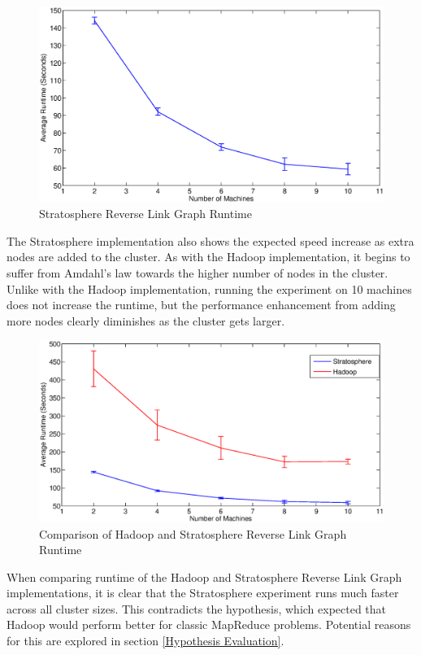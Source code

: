 \begin{figure}[H]
	\centering
	\includegraphics[scale=0.6]{resources/StratRLG.eps}
	\caption{Stratosphere Reverse Link Graph Runtime}
	\label{stratRLGRuntime}
\end{figure}

The Stratosphere implementation also shows the expected speed increase as extra nodes are added to the cluster. As with the Hadoop implementation, it begins to suffer from Amdahl's law towards the higher number of nodes in the cluster. Unlike with the Hadoop implementation, running the experiment on 10 machines does not increase the runtime, but the performance enhancement from adding more nodes clearly diminishes as the cluster gets larger. 

\begin{figure}[H]
	\centering
	\includegraphics[scale=0.6]{resources/HadoopVStratRLG.eps}
	\caption{Comparison of Hadoop and Stratosphere Reverse Link Graph Runtime}
	\label{hadoopvstratRLGRuntime}
\end{figure}

When comparing runtime of the Hadoop and Stratosphere Reverse Link Graph implementations, it is clear that the Stratosphere experiment runs much faster across all cluster sizes. This contradicts the hypothesis, which expected that Hadoop would perform better for classic MapReduce problems. Potential reasons for this are explored in section \ref{Hypothesis Evaluation}.

